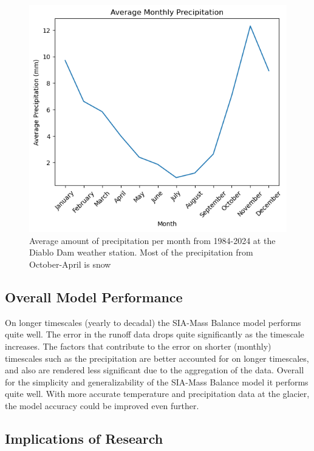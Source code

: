 \documentclass{article}
\begin{document}
\begin{figure}[h!]
    \centering
    \includegraphics[width=\textwidth]{Plots/monthly_precip.png}
    \caption{Average amount of precipitation per month from 1984-2024 at the Diablo Dam weather station. Most of the precipitation from October-April is snow}
    \label{fig:monthly_precip}
\end{figure}    
\FloatBarrier
\subsection{Overall Model Performance}
On longer timescales (yearly to decadal) the SIA-Mass Balance model performs quite well. The error in the runoff data drops quite significantly as the timescale increases. 
The factors that contribute to the error on shorter (monthly) timescales such as the precipitation are better accounted for on longer timescales, 
and also are rendered less significant due to the aggregation of the data. Overall for the simplicity and generalizability of the SIA-Mass Balance model it performs 
quite well. With more accurate temperature and precipitation data at the glacier, the model accuracy could be improved even further.
\subsection{Implications of Research}
\end{document}

